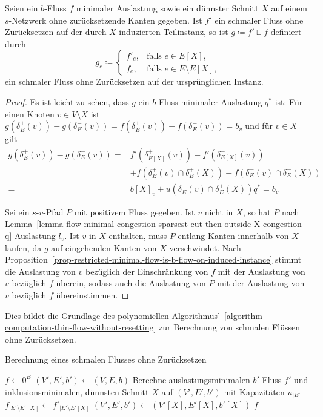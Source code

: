 \begin{corollary}\label{cor-thin-flow-alg-correct}
	Seien ein $b$-Fluss $f$ minimaler Auslastung sowie ein dünnster Schnitt $X$ auf einem $s$-Netzwerk ohne zurücksetzende Kanten gegeben.
	Ist $f'$ ein schmaler Fluss ohne Zurücksetzen auf der durch $X$ induzierten Teilinstanz, so ist $g \coloneq f' \sqcup f$ definiert durch \[
		g_e \coloneq \begin{cases}
			f'_e, & \text{falls $e\in E[X]$,} \\
			f_e, & \text{falls $e\in E\setminus E[X]$,}
		\end{cases}
	\] ein schmaler Fluss ohne Zurücksetzen auf der ursprünglichen Instanz.
\end{corollary}
\begin{proof}
	Es ist leicht zu sehen, dass $g$ ein $b$-Fluss minimaler Auslastung $q^*$ ist:
	Für einen Knoten $v \in V\setminus X$ ist $g(\delta^+_E(v)) - g(\delta^-_E(v)) = f(\delta^+_E(v)) - f(\delta^-_E(v)) = b_v$ und für $v\in X$ gilt
	\begin{align*}
	g(\delta^+_E(v)) - g(\delta^-_E(v)) =& f'(\delta^+_{E[X]}(v)) - f'(\delta^-_{E[X]}(v)) \\
	&+ f(\delta^+_E(v)\cap\delta^+_E(X)) - f(\delta^-_E(v)\cap\delta^-_E(X))
	\\=& b[X]_v + u(\delta^+_E(v)\cap\delta^+_E(X)) q^* = b_v
	\end{align*}

	Sei ein $s$-$v$-Pfad $P$ mit positivem Fluss gegeben.
	Ist $v$ nicht in $X$, so hat $P$ nach Lemma~\ref{lemma-flow-minimal-congestion-sparsest-cut-then-outside-X-congestion-q} Auslastung $l_v$.
	Ist $v$ in $X$ enthalten, muss $P$ entlang Kanten innerhalb von $X$ laufen, da $g$ auf eingehenden Kanten von $X$ verschwindet.
	Nach Proposition~\ref{prop-restricted-minimal-flow-is-b-flow-on-induced-instance} stimmt die Auslastung von $v$ bezüglich der Einschränkung von $f$ mit der Auslastung von $v$ bezüglich $f$ überein, sodass auch die Auslastung von $P$ mit der Auslastung von $v$ bezüglich $f$ übereinstimmen.
\end{proof}

Dies bildet die Grundlage des polynomiellen Algorithmus'~\ref{algorithm-computation-thin-flow-without-resetting} zur Berechnung von schmalen Flüssen ohne Zurücksetzen.

\begin{algorithm}
\caption{Berechnung eines schmalen Flusses ohne Zurücksetzen}
\label{algorithm-computation-thin-flow-without-resetting}
\begin{algorithmic}[1]
	\State $f \gets 0^E$
	\State $(V', E', b') \gets (V, E, b)$
	\State Berechne auslastungsminimalen $b'$-Fluss $f'$ und inklusionsminimalen, 
	\Statex  dünnsten Schnitt $X$ auf $(V', E', b')$ mit Kapazitäten $u_{\mid E'}$
	\State $f_{\mid E'\setminus E'[X]} \gets f'_{\mid E'\setminus E'[X]}$
	\State $(V', E', b') \gets (V'[X], E'[X], b'[X])$
	\EndWhile
	\State\Return $f$
	\EndProcedure
\end{algorithmic}
\end{algorithm}

